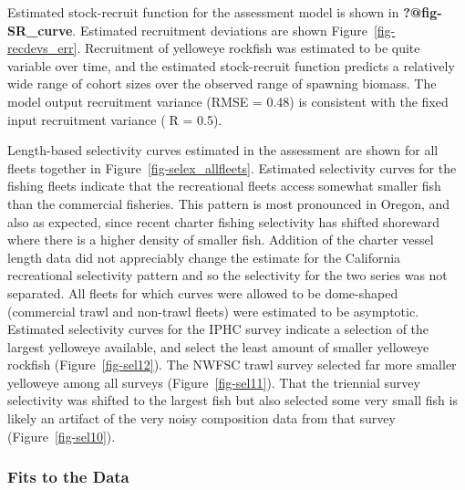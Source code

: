 \documentclass[
]{scrartcl}
\begin{document}
Estimated stock-recruit function for the assessment model is shown in
\textbf{?@fig-SR\_curve}. Estimated recruitment deviations are shown
Figure~\ref{fig-recdevs_err}. Recruitment of yelloweye rockfish was
estimated to be quite variable over time, and the estimated
stock-recruit function predicts a relatively wide range of cohort sizes
over the observed range of spawning biomass. The model output
recruitment variance (RMSE = 0.48) is consistent with the fixed input
recruitment variance (R = 0.5).

Length-based selectivity curves estimated in the assessment are shown
for all fleets together in Figure~\ref{fig-selex_allfleets}. Estimated
selectivity curves for the fishing fleets indicate that the recreational
fleets access somewhat smaller fish than the commercial fisheries. This
pattern is most pronounced in Oregon, and also as expected, since recent
charter fishing selectivity has shifted shoreward where there is a
higher density of smaller fish. Addition of the charter vessel length
data did not appreciably change the estimate for the California
recreational selectivity pattern and so the selectivity for the two
series was not separated. All fleets for which curves were allowed to be
dome-shaped (commercial trawl and non-trawl fleets) were estimated to be
asymptotic. Estimated selectivity curves for the IPHC survey indicate a
selection of the largest yelloweye available, and select the least
amount of smaller yelloweye rockfish (Figure~\ref{fig-sel12}). The NWFSC
trawl survey selected far more smaller yelloweye among all surveys
(Figure~\ref{fig-sel11}). That the triennial survey selectivity was
shifted to the largest fish but also selected some very small fish is
likely an artifact of the very noisy composition data from that survey
(Figure~\ref{fig-sel10}).

\subsubsection{Fits to the Data}\label{fits-to-the-data}
\end{document}
